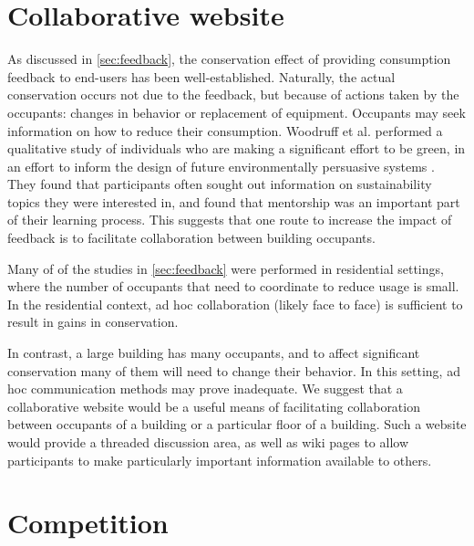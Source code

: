 \documentclass[11pt]{article}
\begin{document}
\section{Collaborative website}
\label{sec:collab-website}

As discussed in \autoref{sec:feedback}, the conservation effect of providing consumption feedback to end-users has been well-established. Naturally, the actual conservation occurs not due to the feedback, but because of actions taken by the occupants: changes in behavior or replacement of equipment. Occupants may seek information on how to reduce their consumption. Woodruff et al. performed a qualitative study of individuals who are making a significant effort to be green, in an effort to inform the design of future environmentally persuasive 
systems \cite{Woodruff2008-bright-green}. They found that participants often sought out information on sustainability topics they were interested in, and found that mentorship was an important part of their learning process. This suggests that one route to increase the impact of feedback is to facilitate collaboration between building occupants.

Many of of the studies in \autoref{sec:feedback} were performed in residential settings, where the number of occupants that need to coordinate to reduce usage is small. In the residential context, ad hoc collaboration (likely face to face) is sufficient to result in gains in conservation.

In contrast, a large building has many occupants, and to affect significant conservation many of them will need to change their behavior. In this setting, ad hoc communication methods may prove inadequate. We suggest that a collaborative website would be a useful means of facilitating collaboration between occupants of a building or a particular floor of a building. Such a website would provide a threaded discussion area, as well as wiki pages to allow participants to make particularly important information available to others.

\section{Competition}
\label{sec:competition}
\end{document}
